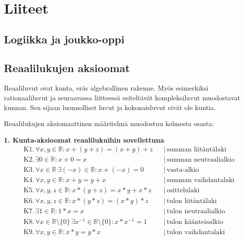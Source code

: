 \part{Liiteet}
\chapter{Logiikka ja joukko-oppi}
\chapter{Reaalilukujen aksioomat}
Reaaliluvut ovat kunta, eräs algebrallinen rakenne. Myös esimerkiksi rationaaliluvut ja seuraavassa liitteessä esiteltävät kompleksiluvut muodostavat kunnan. Sen sijaan luonnolliset luvut ja kokonaisluvut eivät ole kuntia.

Reaalilukujen aksiomaattinen määritelmä muodostuu kolmesta osasta:

\textbf{1. Kunta-aksioomat reaalilukuihin sovellettuna} \\
\begin{align*}
&\text{K1.} \, \forall x, y \in \mathbb{R}: x+(y+z) = (x+y)+z & &| \, \text{summan liitäntälaki} \\
&\text{K2.} \, \exists 0 \in \mathbb{R}: x+0 = x & &| \, \text{summan neutraalialkio} \\
&\text{K3.} \, \forall x \in \mathbb{R} \, \exists (-x) \in \mathbb{R}: x+(-x)=0 & &| \, \text{vasta-alkio} \\
&\text{K4.} \, \forall x, y \in \mathbb{R}: x+y = y+x & &| \, \text{summan vaihdantalaki} \\
&\text{K5.} \, \forall x, y, z \in \mathbb{R}: x*(y+z) = x*y + x*z & &| \, \text{osittelulaki} \\
&\text{K6.} \, \forall x, y, z \in \mathbb{R}: x*(y*z) = (x*y)*z & &| \, \text{tulon liitäntälaki} \\
&\text{K7.} \, \exists 1 \in \mathbb{R}: 1*x = x & &| \, \text{tulon neutraalialkio} \\
&\text{K8.} \, \forall x \in \mathbb{R} \setminus \{0\} \, \exists x^{-1} \in \mathbb{R} \setminus \{0\}: x*x^{-1}=1 & &| \, \text{tulon käänteisalkio} \\
&\text{K9.} \, \forall x, y \in \mathbb{R}: x*y = y*x & &| \, \text{tulon vaihdantalaki}
\end{align*}